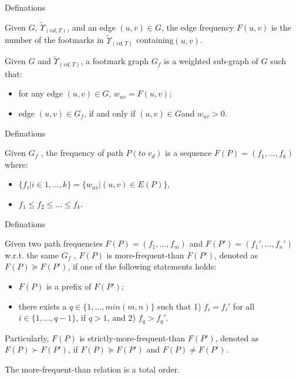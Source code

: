 \documentclass[mathserif]{beamer}
\begin{document}
\begin{frame}{Definations}

\begin{defination}
Given $G$, $\widetilde{\Upsilon}_{(vd,T )}$, and an edge $(u, v) \in{} G$, the edge frequency $F (u, v)$ is the number of the footmarks in $\widetilde{\Upsilon}_{(vd,T )}$ containing$(u,v)$.
\end{defination}
\begin{defination}
Given $G$ and $\widetilde{\Upsilon}_{(vd,T )}$, a footmark graph $G_f$ is a weighted sub-graph of $G$ such that:
	\begin{itemize}
	\item for any edge $(u,v) \in G$, $w_{uv} = F(u,v)$;
	\item edge $(u,v)\in{}G_f$, if and only if $(u,v)\in{} G $and $w_{uv}>0 $.
	\end{itemize}
\end{defination}
\end{frame}

\begin{frame}{Definations}
\begin{defination}
Given $G_f$ , the frequency of path $P (to \; v_d)$ is a sequence $F(P) = (f_1,...,f_k)$ where:
	\begin{itemize}
	\item $\{f_i|i \in{} {1,\ldots{},k}\} = \{w_{uv}|(u,v) \in{} E(P)\}$,
	\item $f_1 \leq{} f_2 \leq{} \ldots{} \leq{} f_k$.
	\end{itemize}
\end{defination}
\end{frame}

\begin{frame}{Definations}
\begin{defination}
Given two path frequencies $F(P) = (f_1,\dots{},f_m)$ and $F(P') = (f_1',\ldots{},f_n' )$ w.r.t. the same $G_f$ , $F (P )$ is more-frequent-than $F (P')$, denoted as
$F (P ) \succeq{} F (P' )$, if one of the following statements holds:
	\begin{itemize}
	\item $F(P)$ is a prefix of $F(P')$;
	\item there exists a $q \in{} \{1,\ldots{},min(m,n)\}$ such that 1) $f_i = f_i'$
for all $i \in{}\{1,\ldots{},q−1\}$, if $q>1$, and 2) $f_q >f_q'$.
	\end{itemize}
Particularly, $F(P)$ is strictly-more-frequent-than $F(P')$, denoted
as $F(P) \succ{} F(P')$, if $F(P) \succeq{} F(P')$ and $F(P) \neq{} F(P')$.
\end{defination}

\begin{theore}
The more-frequent-than relation is a total order.
\end{theore}
\end{frame}
\end{document}
